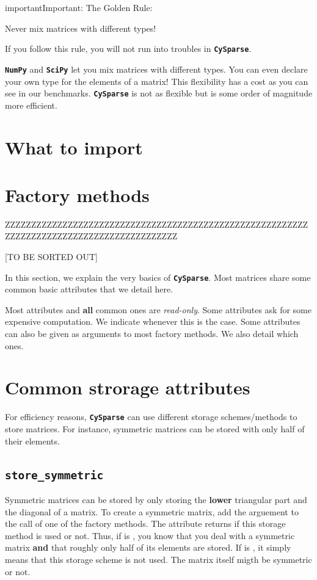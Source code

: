 \documentclass[letterpaper,10pt,english]{sphinxmanual}
\begin{document}
\begin{notice}{important}{Important:}
The Golden Rule:

Never mix matrices with different types!
\end{notice}

If you follow this rule, you will not run into troubles in \textbf{\texttt{CySparse}}.

\textbf{\texttt{NumPy}} and \textbf{\texttt{SciPy}} let you mix matrices with different types. You can even declare your own type for the elements of a matrix! This flexibility has a cost as you can see in our benchmarks. \textbf{\texttt{CySparse}}
is not as flexible but is some order of magnitude more efficient.


\section{What to import}
\label{cysparse_basics:what-to-import}

\section{Factory methods}
\label{cysparse_basics:factory-methods}
ZZZZZZZZZZZZZZZZZZZZZZZZZZZZZZZZZZZZZZZZZZZZZZZZZZZZZZZZZZZZZZZZZZZZZZZZZZZZZZZZZZZZZZZZZZZ

{[}TO BE SORTED OUT{]}

In this section, we explain the very basics of \textbf{\texttt{CySparse}}. Most matrices share some common basic attributes that we detail here.

Most attributes and \textbf{all} common ones are \emph{read-only}. Some attributes ask for some expensive computation. We indicate whenever this is the case.
Some attributes can also be given as arguments to most factory methods. We also detail which ones.


\section{Common strorage attributes}
\label{cysparse_basics:common-strorage-attributes}
For efficiency reasons, \textbf{\texttt{CySparse}} can use different storage schemes/methods to store matrices. For instance, symmetric matrices can be stored with only half of their elements.


\subsection{\texttt{store\_symmetric}}
\label{cysparse_basics:store-symmetric}
Symmetric matrices can be stored by only storing the \textbf{lower} triangular part and the diagonal of a matrix. To create a symmetric matrix, add the arguement  to the call of one of the factory methods.
The attribute  returns if this storage method is used or not. Thus, if  is , you know that you deal with a symmetric matrix \textbf{and} that roughly only half of its elements are stored. If
 is , it simply means that this storage scheme is not used. The matrix itself migth be symmetric or not.
\end{document}
